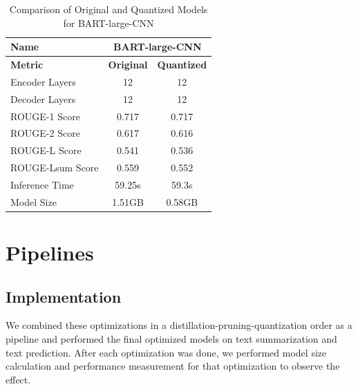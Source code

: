 \documentclass{article}
\begin{document}
    \begin{table}[h!]
        \centering
        \begin{tabular}{lcc}
            \toprule
            \textbf{Name}         & \multicolumn{2}{c}{\textbf{BART-large-CNN}} \\ \midrule
            \textbf{Metric}       & \textbf{Original} & \textbf{Quantized} \\ \midrule
            Encoder Layers        & 12                     & 12                     \\
            Decoder Layers        & 12                     & 12                     \\
            ROUGE-1 Score         & 0.717                  & 0.717                  \\
            ROUGE-2 Score         & 0.617                  & 0.616                  \\
            ROUGE-L Score         & 0.541                  & 0.536                  \\
            ROUGE-Lsum Score      & 0.559                  & 0.552                  \\
            Inference Time        & 59.25s                 & 59.3s                  \\
            Model Size            & 1.51GB                 & 0.58GB                 \\ \bottomrule
        \end{tabular}
        \caption{Comparison of Original and Quantized Models for BART-large-CNN}
        \label{tab:BART_comparison_q}
    \end{table}

    \section{Pipelines}
    \subsection{Implementation}
    \hspace*{1em} We combined these optimizations in a distillation-pruning-quantization order as a pipeline and performed the final optimized models on text summarization and text prediction. After each optimization was done, we performed model size calculation and performance measurement for that optimization to observe the effect.
\end{document}
